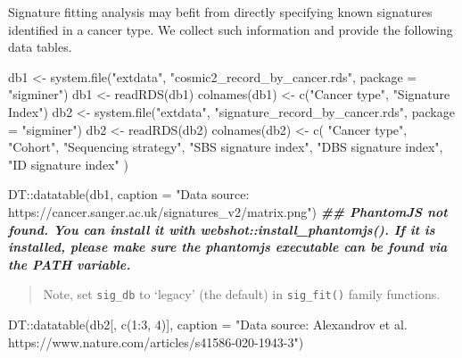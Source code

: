 \documentclass[
  12pt,
  a4paper,
  twoside]{book}
\newenvironment{Shaded}{\begin{snugshade}}{\end{snugshade}}
\newcommand{\AttributeTok}[1]{\textcolor[rgb]{0.77,0.63,0.00}{#1}}
\newcommand{\DecValTok}[1]{\textcolor[rgb]{0.00,0.00,0.81}{#1}}
\newcommand{\DocumentationTok}[1]{\textcolor[rgb]{0.56,0.35,0.01}{\textbf{\textit{#1}}}}
\newcommand{\FunctionTok}[1]{\textcolor[rgb]{0.00,0.00,0.00}{#1}}
\newcommand{\NormalTok}[1]{#1}
\newcommand{\OtherTok}[1]{\textcolor[rgb]{0.56,0.35,0.01}{#1}}
\newcommand{\SpecialCharTok}[1]{\textcolor[rgb]{0.00,0.00,0.00}{#1}}
\newcommand{\StringTok}[1]{\textcolor[rgb]{0.31,0.60,0.02}{#1}}
\begin{document}
Signature fitting analysis may befit from directly specifying known signatures identified in a cancer type. We collect such information and provide the following data tables.

\begin{Shaded}
\begin{Highlighting}[]
\NormalTok{db1 }\OtherTok{\textless{}{-}} \FunctionTok{system.file}\NormalTok{(}\StringTok{"extdata"}\NormalTok{, }\StringTok{"cosmic2\_record\_by\_cancer.rds"}\NormalTok{, }\AttributeTok{package =} \StringTok{"sigminer"}\NormalTok{)}
\NormalTok{db1 }\OtherTok{\textless{}{-}} \FunctionTok{readRDS}\NormalTok{(db1)}
\FunctionTok{colnames}\NormalTok{(db1) }\OtherTok{\textless{}{-}} \FunctionTok{c}\NormalTok{(}\StringTok{"Cancer type"}\NormalTok{, }\StringTok{"Signature Index"}\NormalTok{)}
\NormalTok{db2 }\OtherTok{\textless{}{-}} \FunctionTok{system.file}\NormalTok{(}\StringTok{"extdata"}\NormalTok{, }\StringTok{"signature\_record\_by\_cancer.rds"}\NormalTok{, }\AttributeTok{package =} \StringTok{"sigminer"}\NormalTok{)}
\NormalTok{db2 }\OtherTok{\textless{}{-}} \FunctionTok{readRDS}\NormalTok{(db2)}
\FunctionTok{colnames}\NormalTok{(db2) }\OtherTok{\textless{}{-}} \FunctionTok{c}\NormalTok{(}
  \StringTok{"Cancer type"}\NormalTok{, }\StringTok{"Cohort"}\NormalTok{, }\StringTok{"Sequencing strategy"}\NormalTok{,}
  \StringTok{"SBS signature index"}\NormalTok{,}
  \StringTok{"DBS signature index"}\NormalTok{,}
  \StringTok{"ID signature index"}
\NormalTok{)}
\end{Highlighting}
\end{Shaded}

\begin{Shaded}
\begin{Highlighting}[]
\NormalTok{DT}\SpecialCharTok{::}\FunctionTok{datatable}\NormalTok{(db1, }\AttributeTok{caption =} \StringTok{"Data source: https://cancer.sanger.ac.uk/signatures\_v2/matrix.png"}\NormalTok{)}
\DocumentationTok{\#\# PhantomJS not found. You can install it with webshot::install\_phantomjs(). If it is installed, please make sure the phantomjs executable can be found via the PATH variable.}
\end{Highlighting}
\end{Shaded}

\begin{quote}
Note, set \texttt{sig\_db} to `legacy' (the default) in \texttt{sig\_fit()} family functions.
\end{quote}

\begin{Shaded}
\begin{Highlighting}[]
\NormalTok{DT}\SpecialCharTok{::}\FunctionTok{datatable}\NormalTok{(db2[, }\FunctionTok{c}\NormalTok{(}\DecValTok{1}\SpecialCharTok{:}\DecValTok{3}\NormalTok{, }\DecValTok{4}\NormalTok{)], }\AttributeTok{caption =} \StringTok{"Data source: Alexandrov et al. https://www.nature.com/articles/s41586{-}020{-}1943{-}3"}\NormalTok{)}
\end{Highlighting}
\end{Shaded}
\end{document}
